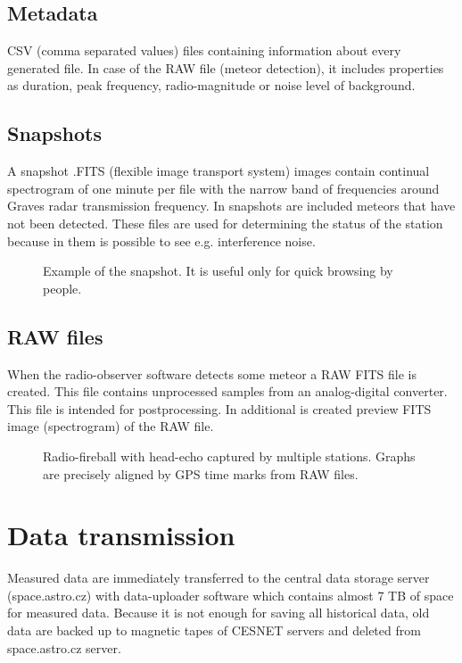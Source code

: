 \documentclass[10pt,a4paper,twoside,dvips]{article}
\begin{document}
\begin{IMCpaper}
\subsection{Metadata}
CSV (comma separated values) files containing information about every generated file. In case of the RAW file (meteor detection), it includes properties as duration, peak frequency, radio-magnitude or noise level of background.                                             

\subsection{Snapshots}
A snapshot .FITS (flexible image transport system) images contain continual spectrogram of one minute per file with the narrow band of frequencies around Graves radar transmission frequency. In snapshots are included meteors that have not been detected. These files are used for determining the status of the station because in them is possible to see e.g. interference noise.                                                      
\begin{figure}[htb]
\centering
{}
\caption{Example of the snapshot. It is useful only for quick browsing by people.}%
\label{snap}
\end{figure}


\subsection{RAW files}
When the radio-observer software detects some meteor a RAW FITS file is created. This file contains unprocessed samples from an analog-digital converter. This file is intended for postprocessing. In additional is created preview FITS image (spectrogram) of the RAW file. 

\begin{figure}[htb]
\centering
{}
\caption{Radio-fireball with head-echo captured by multiple stations. Graphs are precisely aligned by GPS time marks from RAW files.}%
\label{mb}
\end{figure}

\section{Data transmission}
Measured data are immediately transferred to the central data storage server  (space.astro.cz) with data-uploader software which contains almost 7 TB of space for measured data. Because it is not enough for saving all historical data, old data are backed up to magnetic tapes of CESNET servers and deleted from space.astro.cz server.                                                                                 


\end{IMCpaper}
\end{document}
